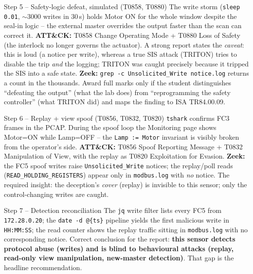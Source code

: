 \documentclass[11pt,a4paper]{article}
\begin{document}
\begin{solutionbox}{Step 5 -- Safety-logic defeat, simulated (T0858, T0880)}
The write storm (\texttt{sleep 0.01}, $\sim$3000 writes in 30\,s) holds
Motor ON for the whole window despite the seal-in logic -- the external
master overrides the output faster than the scan can correct it.
\textbf{ATT\&CK:} T0858 Change Operating Mode + T0880 Loss of Safety
(the interlock no longer governs the actuator). A strong report states
the \emph{caveat}: this is loud (a notice per write), whereas a true
SIS attack (TRITON) tries to disable the trip \emph{and} the logging;
TRITON was caught precisely because it tripped the SIS into a safe
state. \textbf{Zeek:} \texttt{grep -c Unsolicited\_Write notice.log}
returns a count in the thousands. Award full marks only if the student
distinguishes ``defeating the output'' (what the lab does) from
``reprogramming the safety controller'' (what TRITON did) and maps
the finding to ISA TR84.00.09.
\end{solutionbox}

\begin{solutionbox}{Step 6 -- Replay + view spoof (T0856, T0832, T0820)}
\texttt{tshark} confirms FC3 frames in the PCAP. During the spoof loop
the Monitoring page shows Motor=ON while Lamp=OFF -- the
\texttt{Lamp := Motor} invariant is visibly broken from the operator's
side. \textbf{ATT\&CK:} T0856 Spoof Reporting Message + T0832
Manipulation of View, with the replay as T0820 Exploitation for
Evasion. \textbf{Zeek:} the FC5 spoof writes raise
\texttt{Unsolicited\_Write} notices; the replay/poll reads
(\texttt{READ\_HOLDING\_REGISTERS}) appear only in \texttt{modbus.log}
with \emph{no} notice. The required insight: the deception's
\emph{cover} (replay) is invisible to this sensor; only the
control-changing writes are caught.
\end{solutionbox}

\begin{solutionbox}{Step 7 -- Detection reconciliation}
The \texttt{jq} write filter lists every FC5 from \texttt{172.28.0.20};
the \texttt{date -d @\{ts\}} pipeline yields the first malicious write
in \texttt{HH:MM:SS}; the read counter shows the replay traffic sitting
in \texttt{modbus.log} with no corresponding notice. Correct conclusion
for the report: \textbf{this sensor detects protocol abuse (writes) and
is blind to behavioural attacks (replay, read-only view manipulation,
new-master detection)}. That gap is the headline recommendation.
\end{solutionbox}
\end{document}
